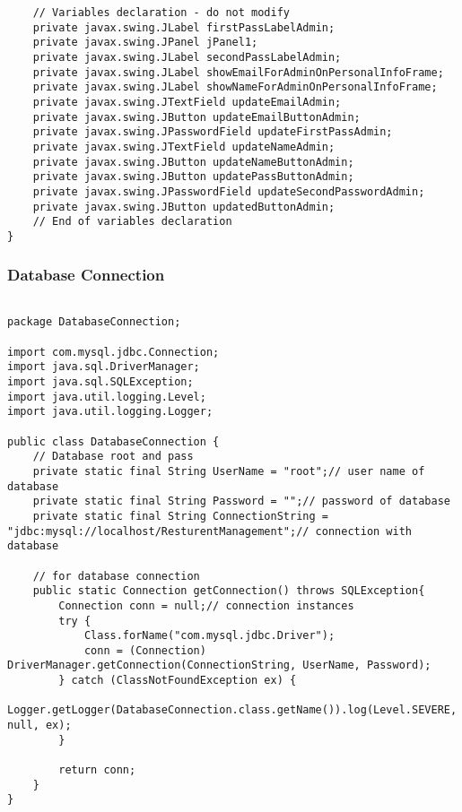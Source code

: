 \documentclass[12pt,a4paper]{article}
\begin{document}
\begin{lstlisting}
    // Variables declaration - do not modify                     
    private javax.swing.JLabel firstPassLabelAdmin;
    private javax.swing.JPanel jPanel1;
    private javax.swing.JLabel secondPassLabelAdmin;
    private javax.swing.JLabel showEmailForAdminOnPersonalInfoFrame;
    private javax.swing.JLabel showNameForAdminOnPersonalInfoFrame;
    private javax.swing.JTextField updateEmailAdmin;
    private javax.swing.JButton updateEmailButtonAdmin;
    private javax.swing.JPasswordField updateFirstPassAdmin;
    private javax.swing.JTextField updateNameAdmin;
    private javax.swing.JButton updateNameButtonAdmin;
    private javax.swing.JButton updatePassButtonAdmin;
    private javax.swing.JPasswordField updateSecondPasswordAdmin;
    private javax.swing.JButton updatedButtonAdmin;
    // End of variables declaration                   
}

	\end{lstlisting}
	\subsubsection{Database Connection}
	\begin{lstlisting}
		
package DatabaseConnection;

import com.mysql.jdbc.Connection;
import java.sql.DriverManager;
import java.sql.SQLException;
import java.util.logging.Level;
import java.util.logging.Logger;

public class DatabaseConnection {
    // Database root and pass
    private static final String UserName = "root";// user name of database
    private static final String Password = "";// password of database
    private static final String ConnectionString = "jdbc:mysql://localhost/ResturentManagement";// connection with database
    
    // for database connection
    public static Connection getConnection() throws SQLException{
        Connection conn = null;// connection instances
        try {
            Class.forName("com.mysql.jdbc.Driver");
            conn = (Connection) DriverManager.getConnection(ConnectionString, UserName, Password);
        } catch (ClassNotFoundException ex) {
            Logger.getLogger(DatabaseConnection.class.getName()).log(Level.SEVERE, null, ex);
        }
        
        return conn;
    }
}

	\end{lstlisting}
	
\end{document}
